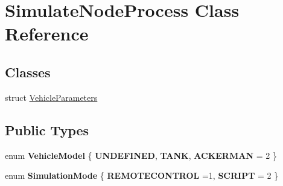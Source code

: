 \hypertarget{classSimulateNodeProcess}{}\section{Simulate\+Node\+Process Class Reference}
\label{classSimulateNodeProcess}
\subsection*{Classes}
\begin{DoxyCompactItemize}
\item 
struct \hyperlink{structSimulateNodeProcess_1_1VehicleParameters}{Vehicle\+Parameters}
\end{DoxyCompactItemize}
\subsection*{Public Types}
\begin{DoxyCompactItemize}
\item 
\mbox{\label{classSimulateNodeProcess_af9da0e358ef876a7a9a55daf0c457502}} 
enum {\bfseries Vehicle\+Model} \{ {\bfseries U\+N\+D\+E\+F\+I\+N\+ED}, 
{\bfseries T\+A\+NK}, 
{\bfseries A\+C\+K\+E\+R\+M\+AN} = 2
 \}
\item 
\mbox{\label{classSimulateNodeProcess_a20c19901fc7d55ec2c95bb5c2bc53e03}} 
enum {\bfseries Simulation\+Mode} \{ {\bfseries R\+E\+M\+O\+T\+E\+C\+O\+N\+T\+R\+OL} =1, 
{\bfseries S\+C\+R\+I\+PT} = 2
 \}
\end{DoxyCompactItemize}
